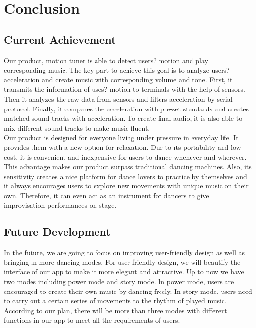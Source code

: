 \documentclass{article}
\begin{document}



















\section{Conclusion}
\subsection{Current Achievement}
\hspace*{2em}Our product, motion tuner is able to detect users? motion and play corresponding music. The key part to achieve this goal is to analyze users? acceleration and create music with corresponding volume and tone. First, it transmits the information of uses? motion to terminals with the help of sensors. Then it analyzes the raw data from sensors and filters acceleration by serial protocol. Finally, it compares the acceleration with pre-set standards and creates matched sound tracks with acceleration. To create final audio, it is also able to mix different sound tracks to make music fluent. \\
\hspace*{2em}Our product is designed for everyone living under pressure in everyday life. It provides them with a new option for relaxation. Due to its portability and low cost, it is convenient and inexpensive for users to dance whenever and wherever. This advantage makes our product surpass traditional dancing machines. Also, its sensitivity creates a nice platform for dance lovers to practice by themselves and it always encourages users to explore new movements with unique music on their own. Therefore, it can even act as an instrument for dancers to give improvisation performances on stage.
\subsection{Future Development}
\hspace*{2em}In the future, we are going to focus on improving user-friendly design as well as bringing in more dancing modes. For user-friendly design, we will beautify the interface of our app to make it more elegant and attractive. Up to now we have two modes including power mode and story mode. In power mode, users are encouraged to create their own music by dancing freely. In story mode, users need to carry out a certain series of movements to the rhythm of played music. According to our plan, there will be more than three modes with different functions in our app to meet all the requirements of users.
\end{document}
